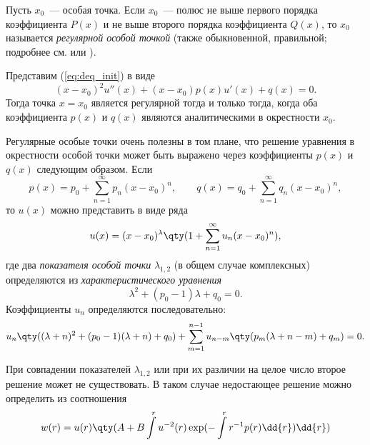 \documentclass[\docroot/reports/draft/report.tex]{subfiles}
\begin{document}
    Пусть $x_0$~--- особая точка. Если $x_0$~--- полюс не выше первого порядка коэффициента $P(x)$ и не выше второго порядка коэффициента $Q(x)$, то $x_0$ называется \textit{регулярной особой точкой} (также обыкновенной, правильной; подробнее см. \cite{whittaker_watson_1} или \cite{fedoryuk_de}).

    Представим (\ref{eq:deq_init}) в виде
    \begin{equation}\label{eq:deq_init}
        (x - x_0)^2 u''(x) + (x - x_0) p(x) u'(x) + q(x) = 0.
    \end{equation}
    Тогда точка $x = x_0$ является регулярной тогда и только тогда, когда оба коэффициента $p(x)$ и $q(x)$ являются аналитическими в окрестности $x_0$.

    Регулярные особые точки очень полезны в том плане, что решение уравнения в окрестности особой точки может быть выражено через коэффициенты $p(x)$ и $q(x)$ следующим образом. Если
    \begin{equation}
        p(x) = p_0 + \sum\limits_{n=1}^\infty p_n (x - x_0)^n, \qquad
        q(x) = q_0 + \sum\limits_{n=1}^\infty q_n (x - x_0)^n,
    \end{equation}
    то $u(x)$ можно представить в виде ряда
    \begin{equation}
        u(x) = (x - x_0)^\lambda \qty(1 + \sum\limits_{n=1}^\infty u_n (x - x_0)^n),
    \end{equation}
    где два \textit{показателя особой точки} $\lambda_{1,2}$ (в общем случае комплексных) определяются из \textit{характеристического уравнения}
    \begin{equation}
        \lambda^2 + (p_0 - 1) \lambda + q_0 = 0.
    \end{equation}
    Коэффициенты $u_n$ определяются последовательно:
    \begin{equation}\label{eq:deq_coefs}
        u_n \qty((\lambda + n)^2 + (p_0 - 1) (\lambda + n) + q_0) +
            \sum\limits_{m = 1}^{n - 1} u_{n - m} \qty(p_m (\lambda + n - m) + q_m) = 0 .
    \end{equation}

    При совпадении показателей $\lambda_{1,2}$ или при их различии на целое число второе решение может не существовать. В таком случае недостающее решение можно определить из соотношения
    \begin{equation}\label{eq:deq_alt_sln}
        w(r) = u(r) \qty(A + B \int\limits^r u^{-2}(r) \exp(- \int\limits^r r^{-1} p(r) \dd{r}) \dd{r})
    \end{equation}

\end{document}
